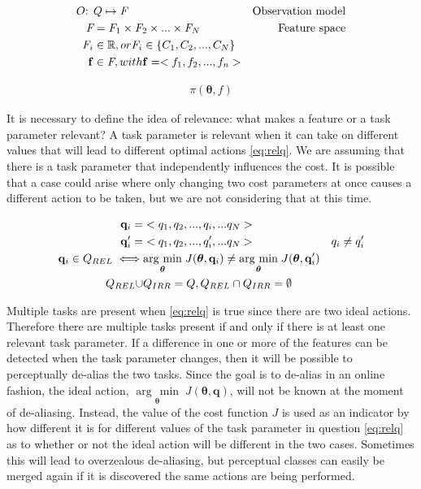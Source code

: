 \documentclass[12pt]{article}
\newcommand{\mymath}[1]{\ensuremath{#1}\xspace}
\newcommand{\app}    {\mymath{\bm{\theta}}}
\newcommand{\taskp}  {\mymath{\mathbf{q}}}
\newcommand{\taskpv} {\mymath{q}}
\newcommand{\taskpsp}{\mymath{Q}}
\newcommand{\costf}  {\mymath{J}}
\newcommand{\feat}   {\mymath{f}}
\newcommand{\featv}  {\mymath{\mathbf{f}}}
\newcommand{\featsp} {\mymath{\emph{F}}}
\newcommand{\obsm}   {\mymath{O}}
\newcommand{\argmin}[1]{\underset{#1}{\operatorname{arg}\,\operatorname{min}}\;}
\begin{document}
\begin{align}
\obsm\mbox{: } &\label{eq:obs}\taskpsp \mapsto \featsp& \mbox{Observation model}\\
\featsp &= \featsp_1 \times \featsp_2 \times ... \times \featsp_N & \mbox{Feature space}\\
\featsp_i &\in \mathbb{R}, or \featsp_i \in \{C_1,C_2,...,C_N\}&\notag\\
\featv &\in \featsp, with \featv = <\feat_1,\feat_2,...,\feat_n>&
\end{align}

\begin{align}
\label{eq:fgating}\pi(\app,\feat)
\end{align}

It is necessary to define the idea of relevance: what makes a feature or a task parameter relevant? A task parameter is relevant when it can take on different values that will lead to different optimal actions \eqref{eq:relq}. We are assuming that there is a task parameter that independently influences the cost. It is possible that a case could arise where only changing two cost parameters at once causes a different action to be taken, but we are not considering that at this time. 

\begin{align}
\taskp_i =& <\taskpv_1,\taskpv_2,...,\taskpv_i,...\taskpv_N> \notag & 
\\
\taskp'_i =& <\taskpv_1,\taskpv_2,...,\taskpv'_i,...\taskpv_N> \notag & \taskpv_i \neq \taskpv'_i \\
\label{eq:relq} \taskp_i \in \taskpsp_{REL} \iff&\argmin{\app}\costf(\app,\taskp_i) \neq \argmin{\app}\costf(\app,\taskp'_i)\\
\taskpsp_{REL} \cup & \taskpsp_{IRR} = \taskpsp,   \taskpsp_{REL} \cap \taskpsp_{IRR} = \emptyset 
\end{align}

Multiple tasks are present when \eqref{eq:relq} is true since there are two ideal actions. Therefore there are multiple tasks present if and only if there is at least one relevant task parameter. If a difference in one or more of the features can be detected when the task parameter changes, then it will be possible to perceptually de-alias the two tasks. Since the goal is to de-alias in an online fashion, the ideal action, $\argmin{\app}\costf(\app,\taskp)$, will not be known at the moment of de-aliasing. Instead, the value of the cost function $\costf$ is used as an indicator by how different it is for different values of the task parameter in question \eqref{eq:relq} as to whether or not the ideal action will be different in the two cases. Sometimes this will lead to overzealous de-aliasing, but perceptual classes can easily be merged again if it is discovered the same actions are being performed.
\end{document}
